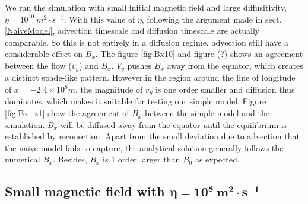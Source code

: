 \documentclass[11pt]{article}
\begin{document}
We ran the simulation with small initial magnetic field and large diffusitivity, $\eta = 10^{10} \ m^2\cdot s^{-1} $. With this value of $\eta$, following the argument made in sect. \ref{NaiveModel}, advection timescale and diffusion timescale are actually comparable. So this is not entirely in a diffusion regime, advection still have a considerable effect on $B_x$. The figure \ref{fig:Bx10} and figure (?) shows an agreement between the flow ($v_y$) and $B_x$. $V_y$ pushes $B_x$ away from the equator, which creates a distinct spade-like pattern. However,in the region around the line of longitude of $x = -2.4 \times 10^{8} m $, the magnitude of $v_y$ is one order smaller and diffusion thus dominates, which makes it suitable for testing our simple model. Figure \ref{fig:Bx_z1} show the agreement of $B_x$ between the simple model and the simulation. $B_x$ will be diffused away from the equator until the equilibrium is established by reconection. Apart from the small deviation due to advection that the naive model fails to capture, the analytical solution generally follows the numerical $B_x$. Besides, $B_x$ is 1 order larger than $B_0$ as expected.
\label{sec:eta10}
\subsection{Small magnetic field with $ \boldsymbol{\eta} = \boldsymbol{10^{8}} \ \boldsymbol{m^2 \cdot s^{-1}}$} 
\end{document}
